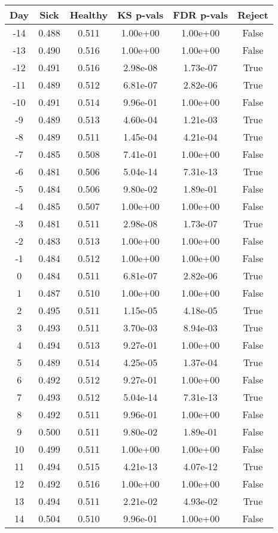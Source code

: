 \begin{tabular}{c|c|c|c|c|c}
Day &  Sick & Healthy &  KS p-vals & FDR p-vals & Reject\\
\hline
-14 & 0.488 &   0.511 &   1.00e+00 &   1.00e+00 &  False\\
-13 & 0.490 &   0.516 &   1.00e+00 &   1.00e+00 &  False\\
-12 & 0.491 &   0.516 &   2.98e-08 &   1.73e-07 &   True\\
-11 & 0.489 &   0.512 &   6.81e-07 &   2.82e-06 &   True\\
-10 & 0.491 &   0.514 &   9.96e-01 &   1.00e+00 &  False\\
 -9 & 0.489 &   0.513 &   4.60e-04 &   1.21e-03 &   True\\
 -8 & 0.489 &   0.511 &   1.45e-04 &   4.21e-04 &   True\\
 -7 & 0.485 &   0.508 &   7.41e-01 &   1.00e+00 &  False\\
 -6 & 0.481 &   0.506 &   5.04e-14 &   7.31e-13 &   True\\
 -5 & 0.484 &   0.506 &   9.80e-02 &   1.89e-01 &  False\\
 -4 & 0.485 &   0.507 &   1.00e+00 &   1.00e+00 &  False\\
 -3 & 0.481 &   0.511 &   2.98e-08 &   1.73e-07 &   True\\
 -2 & 0.483 &   0.513 &   1.00e+00 &   1.00e+00 &  False\\
 -1 & 0.484 &   0.512 &   1.00e+00 &   1.00e+00 &  False\\
  0 & 0.484 &   0.511 &   6.81e-07 &   2.82e-06 &   True\\
  1 & 0.487 &   0.510 &   1.00e+00 &   1.00e+00 &  False\\
  2 & 0.495 &   0.511 &   1.15e-05 &   4.18e-05 &   True\\
  3 & 0.493 &   0.511 &   3.70e-03 &   8.94e-03 &   True\\
  4 & 0.494 &   0.513 &   9.27e-01 &   1.00e+00 &  False\\
  5 & 0.489 &   0.514 &   4.25e-05 &   1.37e-04 &   True\\
  6 & 0.492 &   0.512 &   9.27e-01 &   1.00e+00 &  False\\
  7 & 0.493 &   0.512 &   5.04e-14 &   7.31e-13 &   True\\
  8 & 0.492 &   0.511 &   9.96e-01 &   1.00e+00 &  False\\
  9 & 0.500 &   0.511 &   9.80e-02 &   1.89e-01 &  False\\
 10 & 0.499 &   0.511 &   1.00e+00 &   1.00e+00 &  False\\
 11 & 0.494 &   0.515 &   4.21e-13 &   4.07e-12 &   True\\
 12 & 0.492 &   0.516 &   1.00e+00 &   1.00e+00 &  False\\
 13 & 0.494 &   0.511 &   2.21e-02 &   4.93e-02 &   True\\
 14 & 0.504 &   0.510 &   9.96e-01 &   1.00e+00 &  False\\
\end{tabular}